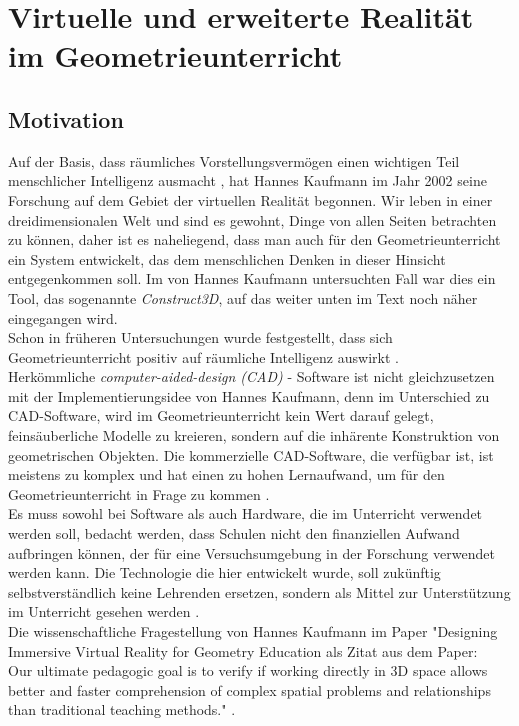 \documentclass[deutsch]{llncs}
\begin{document}
\section{Virtuelle und erweiterte Realität im Geometrieunterricht}
\subsection{Motivation}
Auf der Basis, dass räumliches Vorstellungsvermögen einen wichtigen Teil menschlicher Intelligenz ausmacht \cite{spatial}, hat Hannes Kaufmann im Jahr 2002 seine Forschung auf dem Gebiet der virtuellen Realität begonnen.
Wir leben in einer dreidimensionalen Welt und sind es gewohnt, Dinge von allen Seiten betrachten zu können, daher ist es naheliegend, dass man auch für den Geometrieunterricht ein System entwickelt,
das dem menschlichen Denken in dieser Hinsicht entgegenkommen soll. Im von Hannes Kaufmann untersuchten Fall war dies ein Tool, das sogenannte \emph{Construct3D}, auf das weiter unten im Text noch näher eingegangen wird. \\
Schon in früheren Untersuchungen wurde festgestellt, dass sich Geometrieunterricht positiv auf räumliche Intelligenz auswirkt \cite{GittlerDifferentialTO}. \\
Herkömmliche  \emph{computer-aided-design (CAD)} - Software ist nicht gleichzusetzen mit der Implementierungsidee von Hannes Kaufmann, denn im Unterschied zu CAD-Software, wird im Geometrieunterricht kein Wert darauf gelegt, feinsäuberliche Modelle zu kreieren, sondern auf die inhärente Konstruktion von geometrischen Objekten. Die kommerzielle CAD-Software, die verfügbar ist, ist meistens zu komplex und hat einen zu hohen Lernaufwand, um für den Geometrieunterricht in Frage zu kommen  \cite{Kaufmann:2002:MGE:1242073.1242086}. \\
Es muss sowohl bei Software als auch Hardware, die im Unterricht verwendet werden soll, bedacht werden, dass Schulen nicht den finanziellen Aufwand aufbringen können, der für eine Versuchsumgebung in der Forschung verwendet werden kann.  Die Technologie die hier entwickelt wurde, soll zukünftig selbstverständlich keine Lehrenden ersetzen, sondern als Mittel zur Unterstützung im Unterricht gesehen werden \cite{article}. \\
Die wissenschaftliche Fragestellung von Hannes Kaufmann im Paper "Designing Immersive Virtual Reality for Geometry Education als Zitat aus dem Paper: \\
Our ultimate pedagogic goal is to verify if working directly in 3D space allows better and faster comprehension of complex spatial problems and relationships than traditional teaching methods." \cite{1667626}. \\
\end{document}
